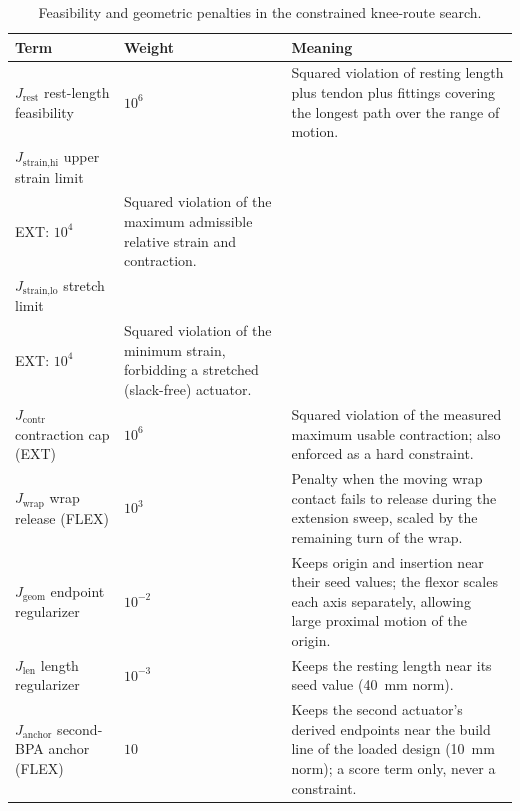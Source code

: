 \begin{table}[htbp]
\caption{Feasibility and geometric penalties in the constrained knee-route search.}\label{tab:mesh_geometry_penalties}
\small\singlespacing
\begin{tabularx}{\textwidth}{@{}>{\raggedright\arraybackslash}p{}p{}>{\raggedright\arraybackslash}X@{}}
\toprule
\textbf{Term} & \textbf{Weight} & \textbf{Meaning} \\
\midrule
$J_{\text{rest}}$ rest-length feasibility & $10^{6}$ & Squared violation of resting length plus tendon plus fittings covering the longest path over the range of motion. \\
$J_{\text{strain,hi}}$ upper strain limit & \shortstack[l]{FLEX: $10^{7}$\\EXT: $10^{4}$} & Squared violation of the maximum admissible relative strain and contraction. \\
$J_{\text{strain,lo}}$ stretch limit & \shortstack[l]{FLEX: $10^{7}$\\EXT: $10^{4}$} & Squared violation of the minimum strain, forbidding a stretched (slack-free) actuator. \\
$J_{\text{contr}}$ contraction cap (EXT) & $10^{6}$ & Squared violation of the measured maximum usable contraction; also enforced as a hard constraint. \\
$J_{\text{wrap}}$ wrap release (FLEX) & $10^{3}$ & Penalty when the moving wrap contact fails to release during the extension sweep, scaled by the remaining turn of the wrap. \\
$J_{\text{geom}}$ endpoint regularizer & $10^{-2}$ & Keeps origin and insertion near their seed values; the flexor scales each axis separately, allowing large proximal motion of the origin. \\
$J_{\text{len}}$ length regularizer & $10^{-3}$ & Keeps the resting length near its seed value (\qty{40}{\mm} norm). \\
$J_{\text{anchor}}$ second-BPA anchor (FLEX) & $10$ & Keeps the second actuator's derived endpoints near the build line of the loaded design (\qty{10}{\mm} norm); a score term only, never a constraint. \\
\bottomrule
\end{tabularx}
\end{table}

